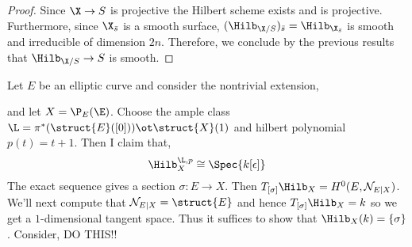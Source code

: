 \documentclass[12pt]{article}
\begin{document}
\begin{proof}
Since $\X \to S$ is projective the Hilbert scheme exists and is projective. Furthermore, since $\X_{\bar{s}}$ is a smooth surface, $(\Hilb_{\X/S})_{\bar{s}} = \Hilb_{\X_{\bar{s}}}$ is smooth and irreducible of dimension $2n$. Therefore, we conclude by the previous results that $\Hilb_{\X/S} \to S$ is smooth.
\end{proof}

\newcommand{\cN}{\mathcal{N}}

\begin{example}
Let $E$ be an elliptic curve and consider the nontrivial extension,
\begin{center}
\end{center}
and let $X = \P_E(\E)$. Choose the ample class $\L = \pi^*( \struct{E}([0]) ) \ot \struct{X}(1)$ and hilbert polynomial $p(t) = t + 1$. Then I claim that,
\[ \Hilb_{X}^{\L, p} \cong \Spec{k[\epsilon]} \]
The exact sequence gives a section $\sigma : E \to X$. Then $T_{[\sigma]} \Hilb_X = H^0(E, \cN_{E|X})$. We'll next compute that $\cN_{E|X} = \struct{E}$ and hence $T_{[\sigma]} \Hilb_X = k$ so we get a $1$-dimensional tangent space. Thus it suffices to show that $\Hilb_X(k) = \{ \sigma \}$. Consider, DO THIS!!
\end{example}
\end{document}
